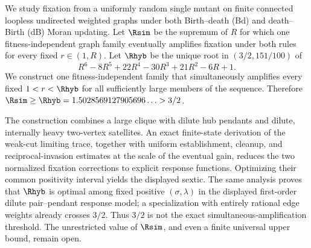 
We study fixation from a uniformly random single mutant on finite connected
loopless undirected weighted graphs under both Birth--death (Bd) and
death--Birth (dB) Moran updating.  Let $\Rsim$ be the supremum of $R$
for which one fitness-independent graph family eventually amplifies fixation
under both rules for every fixed $r\in(1,R)$.  Let $\Rhyb$ be
the unique root in $(3/2,151/100)$ of
\[
 R^6-8R^5+22R^4-30R^3+21R^2-6R+1.
\]
We construct one fitness-independent family that simultaneously amplifies
every fixed $1<r<\Rhyb$ for all sufficiently large members of the sequence.
Therefore
$\Rsim\geq\Rhyb=1.5028569127905696\ldots>3/2$.

The construction combines a large clique with dilute hub pendants and
dilute, internally heavy two-vertex satellites.  An exact finite-state
derivation of the weak-cut limiting trace, together with uniform establishment, cleanup, and
reciprocal-invasion estimates at the scale of the eventual gain, reduces the two
normalized fixation corrections to explicit response functions.  Optimizing
their common positivity interval yields the displayed sextic.  The same
analysis proves that $\Rhyb$ is optimal among fixed positive
$(\sigma,\lambda)$ in the displayed first-order dilute pair--pendant response
model; a specialization with entirely rational edge weights already crosses
$3/2$.  Thus $3/2$ is not the exact simultaneous-amplification threshold.
The unrestricted value of $\Rsim$, and even a finite universal upper bound,
remain open.
